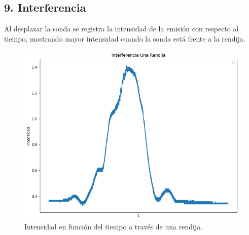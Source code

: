 \documentclass[a4paper,twocolumn,10pt]{article}
\begin{document}
\subsection*{9. Interferencia}
Al desplazar la sonda se registra la intensidad de la emisión con respecto al tiempo, mostrando mayor intensidad cuando la sonda está frente a la rendija. 
\begin{figure}[H]
    \centering
    \includegraphics[scale=.3]{PlotMOAnalisis/plot_una_rendija.png}
    \caption{Intensidad en función del tiempo a través de una rendija.}
    \label{fig:my_label}
\end{figure}
\end{document}
